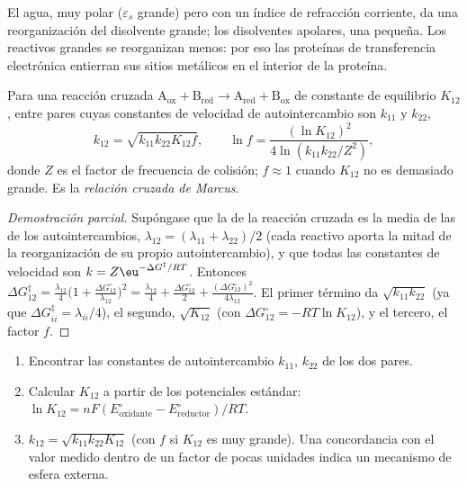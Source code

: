 \admitted

El agua, muy polar ($\varepsilon_s$ grande) pero con un índice de refracción corriente, da una
reorganización del disolvente grande; los disolventes apolares, una pequeña. Los reactivos grandes
se reorganizan menos: por eso las proteínas de transferencia electrónica entierran sus sitios metálicos
en el interior de la proteína.

\begin{theorem}\label{thm:b3:complex-mechanisms:cross-relation}
Para una reacción cruzada $\mathrm{A_{ox} + B_{red} \to A_{red} + B_{ox}}$ de constante de equilibrio $K_{12}$, entre pares
cuyas constantes de velocidad de autointercambio son $k_{11}$ y $k_{22}$,
\[
  k_{12} = \sqrt{k_{11}k_{22}K_{12}f}, \qquad \ln f = \frac{(\ln K_{12})^2}{4\ln(k_{11}k_{22}/Z^2)},
\]
donde $Z$ es el factor de frecuencia de colisión; $f \approx 1$ cuando $K_{12}$ no es demasiado grande. Es la
\emph{relación cruzada de Marcus}.
\end{theorem}

\begin{proof}[Demostración parcial]
Supóngase que la  de la reacción cruzada es la media de las de los
autointercambios, $\lambda_{12} = (\lambda_{11} + \lambda_{22})/2$ (cada reactivo aporta la mitad de la reorganización de su
propio autointercambio), y que todas las constantes de velocidad son $k = Z\eu^{-\Delta G^{\ddagger}/RT}$. Entonces
$\Delta G_{12}^{\ddagger} = \frac{\lambda_{12}}{4}\bigl(1 + \frac{\Delta G^\circ_{12}}{\lambda_{12}}\bigr)^2 = \frac{\lambda_{12}}{4} + \frac{\Delta G^\circ_{12}}{2} + \frac{(\Delta G^\circ_{12})^2}{4\lambda_{12}}$. El primer término da
$\sqrt{k_{11}k_{22}}$ (ya que $\Delta G^{\ddagger}_{ii} = \lambda_{ii}/4$), el segundo, $\sqrt{K_{12}}$ (con $\Delta G^\circ_{12} = -RT\ln K_{12}$), y el tercero,
el factor $f$.
\end{proof}

\begin{method}\label{met:b3:complex-mechanisms:marcus-estimate}
\begin{enumerate}
  \item Encontrar las constantes de autointercambio $k_{11}$, $k_{22}$ de los dos pares.
  \item Calcular $K_{12}$ a partir de los potenciales estándar: $\ln K_{12} = nF(E^\circ_{\text{oxidante}} - E^\circ_{\text{reductor}})/RT$.
  \item $k_{12} = \sqrt{k_{11}k_{22}K_{12}}$ (con $f$ si $K_{12}$ es muy grande). Una concordancia con el valor medido
        dentro de un factor de pocas unidades indica un mecanismo de esfera externa.
\end{enumerate}
\end{method}

